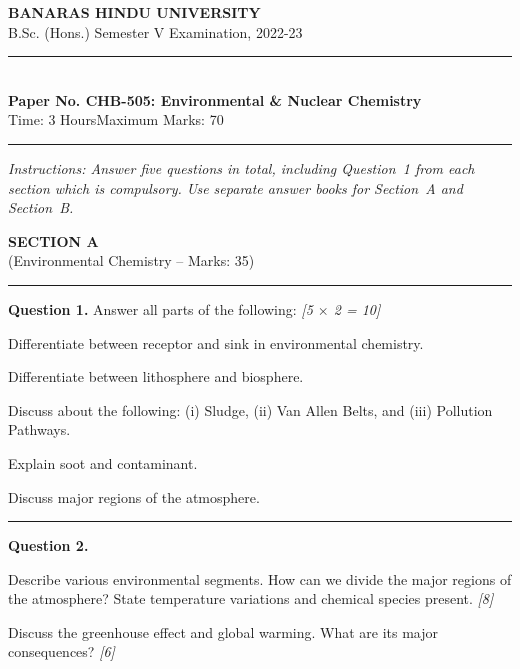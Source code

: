 \documentclass[11pt,a4paper]{article}
\newcommand{\pts}[1]{\hfill   \textit{[#1]}}
\begin{document}
\begin{center}
  {\large\bfseries BANARAS HINDU UNIVERSITY}\\[2pt]
  {\normalsize B.Sc. (Hons.) Semester V Examination, 2022-23}\\[6pt]
  \rule{0.8\linewidth}{0.5pt}\\[6pt]
  {\large\bfseries Paper No. CHB-505: Environmental \& Nuclear Chemistry}\\[4pt]
  {\normalsize Time: 3 Hours\hfill Maximum Marks: 70}
\end{center}
\rule{\linewidth}{0.4pt}
\small



\noindent   \textit{Instructions: Answer five questions in total, including Question~1 from each section which is compulsory. Use separate answer books for Section~A and Section~B.}

\normalsize
\bigskip


\begin{center}
  {\large\bfseries SECTION A}\\[2pt]
  {\normalsize (Environmental Chemistry -- Marks: 35)}
\end{center}
\rule{0.4\linewidth}{0.2pt}
\smallskip




\noindent   \textbf{Question 1.} Answer all parts of the following: \pts{5 $ \times$ 2 = 10}

\begin{parts}
  \item Differentiate between receptor and sink in environmental chemistry.
  \item Differentiate between lithosphere and biosphere.
  \item Discuss about the following: (i) Sludge, (ii) Van Allen Belts, and (iii) Pollution Pathways.
  \item Explain soot and contaminant.
  \item Discuss major regions of the atmosphere.
\end{parts}

\medskip\rule{\linewidth}{0.2pt}




\noindent   \textbf{Question 2.}

\begin{parts}
  \item Describe various environmental segments. How can we divide the major regions of the atmosphere? State temperature variations and chemical species present. \pts{8}
  \item Discuss the greenhouse effect and global warming. What are its major consequences? \pts{6}
\end{parts}
\end{document}
